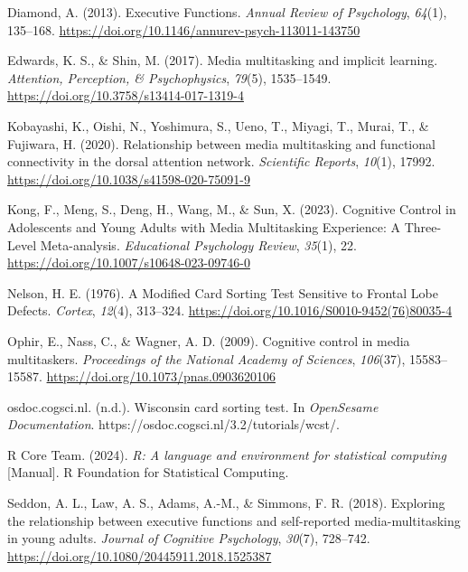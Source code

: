 \documentclass[
  man]{apa7}
\newlength{\cslhangindent}
\newenvironment{CSLReferences}[2] %
 {\begin{list}{}{%
  \setlength{\itemindent}{0pt}
  \setlength{\leftmargin}{0pt}
  \setlength{\parsep}{0pt}
  \ifodd #1
   \setlength{\leftmargin}{\cslhangindent}
   \setlength{\itemindent}{-1\cslhangindent}
  \fi
  \setlength{\itemsep}{#2\baselineskip}}}
 {\end{list}}
\begin{document}
\begin{CSLReferences}{1}{0}
Diamond, A. (2013). Executive {Functions}. \emph{Annual Review of Psychology}, \emph{64}(1), 135--168. \url{https://doi.org/10.1146/annurev-psych-113011-143750}

Edwards, K. S., \& Shin, M. (2017). Media multitasking and implicit learning. \emph{Attention, Perception, \& Psychophysics}, \emph{79}(5), 1535--1549. \url{https://doi.org/10.3758/s13414-017-1319-4}

Kobayashi, K., Oishi, N., Yoshimura, S., Ueno, T., Miyagi, T., Murai, T., \& Fujiwara, H. (2020). Relationship between media multitasking and functional connectivity in the dorsal attention network. \emph{Scientific Reports}, \emph{10}(1), 17992. \url{https://doi.org/10.1038/s41598-020-75091-9}

Kong, F., Meng, S., Deng, H., Wang, M., \& Sun, X. (2023). Cognitive {Control} in {Adolescents} and {Young Adults} with {Media Multitasking Experience}: A {Three-Level Meta-analysis}. \emph{Educational Psychology Review}, \emph{35}(1), 22. \url{https://doi.org/10.1007/s10648-023-09746-0}

Nelson, H. E. (1976). A {Modified Card Sorting Test Sensitive} to {Frontal Lobe Defects}. \emph{Cortex}, \emph{12}(4), 313--324. \url{https://doi.org/10.1016/S0010-9452(76)80035-4}

Ophir, E., Nass, C., \& Wagner, A. D. (2009). Cognitive control in media multitaskers. \emph{Proceedings of the National Academy of Sciences}, \emph{106}(37), 15583--15587. \url{https://doi.org/10.1073/pnas.0903620106}

osdoc.cogsci.nl. (n.d.). Wisconsin card sorting test. In \emph{OpenSesame Documentation}. https://osdoc.cogsci.nl/3.2/tutorials/wcst/.

R Core Team. (2024). \emph{R: A language and environment for statistical computing} {[}Manual{]}. R Foundation for Statistical Computing.

Seddon, A. L., Law, A. S., Adams, A.-M., \& Simmons, F. R. (2018). Exploring the relationship between executive functions and self-reported media-multitasking in young adults. \emph{Journal of Cognitive Psychology}, \emph{30}(7), 728--742. \url{https://doi.org/10.1080/20445911.2018.1525387}


\end{CSLReferences}
\end{document}
